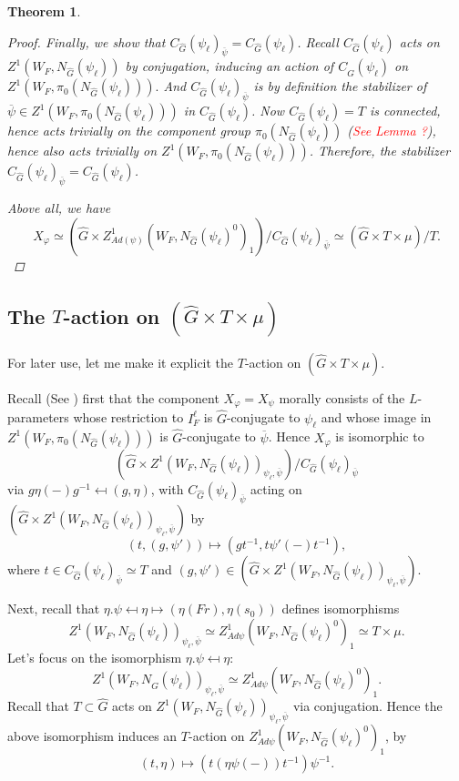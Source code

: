 \documentclass{article}
\newcommand{\red}[1]{\textcolor{red}{#1}}
\newtheorem{theorem}{Theorem}
\begin{document}
\begin{theorem}
\begin{proof}
    	Finally, we show that $C_{\hat{G}}(\psi_{\ell})_{\overline{\psi}}=C_{\hat{G}}(\psi_{\ell})$. Recall $C_{\hat{G}}(\psi_{\ell})$ acts on $Z^1(W_F, N_{\hat{G}}(\psi_{\ell}))$ by conjugation, inducing an action of $C_{\hat{G}}(\psi_{\ell})$ on $Z^1(W_F, \pi_0(N_{\hat{G}}(\psi_{\ell}))).$ And $C_{\hat{G}}(\psi_{\ell})_{\overline{\psi}}$ is by definition the stabilizer of $\overline{\psi} \in Z^1(W_F, \pi_0(N_{\hat{G}}(\psi_{\ell})))$ in $C_{\hat{G}}(\psi_{\ell})$. Now $C_{\hat{G}}(\psi_{\ell})=T$ is connected, hence acts trivially on the component group $\pi_0(N_{\hat{G}}(\psi_{\ell}))$ (\red{See Lemma ?}), hence also acts trivially on $Z^1(W_F, \pi_0(N_{\hat{G}}(\psi_{\ell})))$. Therefore, the stabilizer $C_{\hat{G}}(\psi_{\ell})_{\overline{\psi}}=C_{\hat{G}}(\psi_{\ell})$.
    	
    	Above all, we have 
    	$$X_{\varphi} \simeq (\hat{G} \times Z^1_{Ad(\psi)}(W_F, N_{\hat{G}}(\psi_{\ell})^0)_1)/C_{\hat{G}}(\psi_{\ell})_{\overline{\psi}} \simeq (\hat{G} \times T \times \mu)/T.$$
    \end{proof}
\end{theorem}

\subsection{The $T$-action on $(\hat{G} \times T \times \mu)$}

For later use, let me make it explicit the $T$-action on $(\hat{G} \times T \times \mu)$.

Recall (See \cite[Subsection 4.6]{dat2022ihes}) first that the component $X_{\varphi}=X_{\psi}$ morally consists of the $L$-parameters whose restriction to $I_F^{\ell}$ is $\hat{G}$-conjugate to $\psi_{\ell}$ and whose image in $Z^1(W_F, \pi_0(N_{\hat{G}}(\psi_{\ell})))$ is $\hat{G}$-conjugate to $\overline{\psi}$. Hence $X_{\varphi}$ is isomorphic to 
$$(\hat{G} \times Z^1(W_F, N_{\hat{G}}(\psi_{\ell}))_{\psi_{\ell}, \overline{\psi}})/C_{\hat{G}}(\psi_{\ell})_{\overline{\psi}}$$
via $g\eta(-)g^{-1} \mapsfrom (g, \eta)$, with $C_{\hat{G}}(\psi_{\ell})_{\overline{\psi}}$ acting on $(\hat{G} \times Z^1(W_F, N_{\hat{G}}(\psi_{\ell}))_{\psi_{\ell}, \overline{\psi}})$ by 
$$(t, (g, \psi')) \mapsto (gt^{-1}, t\psi'(-)t^{-1}),$$
where $t \in C_{\hat{G}}(\psi_{\ell})_{\overline{\psi}} \simeq T$ and $(g, \psi') \in (\hat{G} \times Z^1(W_F, N_{\hat{G}}(\psi_{\ell}))_{\psi_{\ell}, \overline{\psi}})$.

Next, recall that $\eta.\psi \mapsfrom \eta \mapsto (\eta(Fr), \eta(s_0))$ defines isomorphisms
$$Z^1(W_F, N_{\hat{G}}(\psi_{\ell}))_{\psi_{\ell}, \overline{\psi}} \simeq Z^1_{Ad\psi}(W_F, N_{\hat{G}}(\psi_{\ell})^0)_1 \simeq T \times \mu.$$
Let's focus on the isomorphism $\eta.\psi \mapsfrom \eta$:
$$Z^1(W_F, N_{\hat{G}}(\psi_{\ell}))_{\psi_{\ell}, \overline{\psi}} \simeq Z^1_{Ad\psi}(W_F, N_{\hat{G}}(\psi_{\ell})^0)_1.$$
Recall that $T \subset \hat{G}$ acts on $Z^1(W_F, N_{\hat{G}}(\psi_{\ell}))_{\psi_{\ell}, \overline{\psi}}$ via conjugation. Hence the above isomorphism induces an $T$-action on $Z^1_{Ad\psi}(W_F, N_{\hat{G}}(\psi_{\ell})^0)_1$, by
$$(t, \eta) \mapsto (t(\eta\psi(-)) t^{-1})\psi^{-1}.$$
\end{document}
